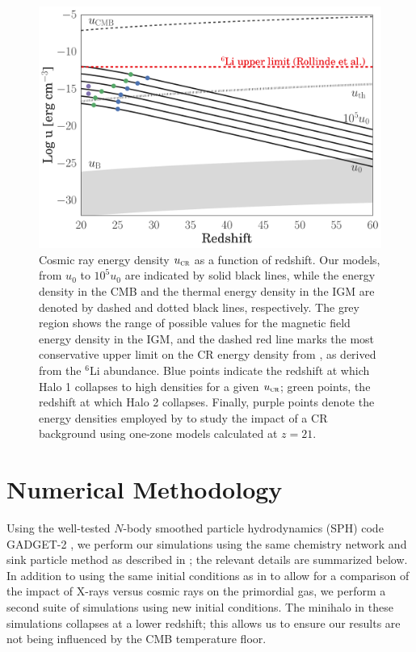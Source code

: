 \documentclass[../thesis.tex]{subfiles}
\begin{document}
\begin{figure}
\begin{center}
\includegraphics[width=1\columnwidth]{figures/u_cr/u_cr}
\caption{\label{fig:ucr}
Cosmic ray energy density ${u}_{\textsc{cr}}$ as a function of redshift.  
Our models, from $u_0$ to $10^5u_0$ are indicated by solid black lines, while the energy density in the CMB and the thermal energy density in the IGM are denoted by dashed and dotted black lines, respectively. 
The grey region shows the range of possible values for the magnetic field energy density in the IGM, and the dashed red line marks the most conservative upper limit on the CR energy density from \citet{RollindeVangioniOlive2006}, as derived from the $^6$Li abundance. 
Blue points indicate the redshift at which Halo 1 collapses to high densities for a given ${u}_{\textsc{cr}}$; green points, the redshift at which Halo 2 collapses.  
Finally, purple points denote the energy densities employed by \citet{StacyBromm2007} to study the impact of a CR background using one-zone models calculated at $z=21$.%
}
\end{center}
\end{figure}

\section{Numerical Methodology}
\label{sec:methods}
Using the well-tested $N$-body smoothed particle hydrodynamics (SPH) code GADGET-2 \citep{Springel2005}, we perform our simulations using the same chemistry network and sink particle method as described in \citet{Hummeletal2015}; the relevant details are summarized below.  
In addition to using the same initial conditions as in \citet{Hummeletal2015} to allow for a comparison of the impact of X-rays versus cosmic rays on the primordial gas, we perform a second suite of simulations using new initial conditions.  
The minihalo in these simulations collapses at a lower redshift; this allows us to ensure our results are not being influenced by the CMB temperature floor.
\end{document}
